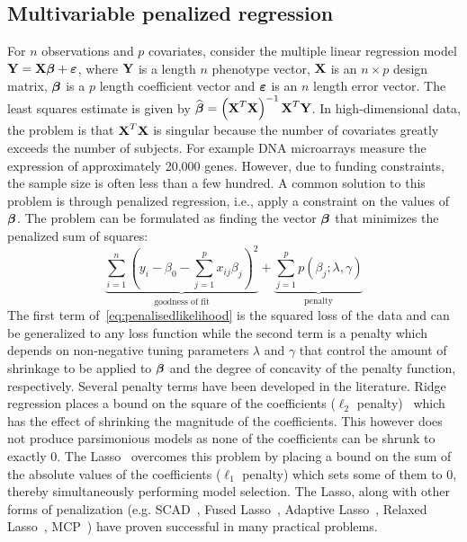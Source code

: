 \subsection{Multivariable penalized regression} \label{sec:pen}
For $n$ observations and $p$ covariates, consider the multiple linear regression model \mbox{$\textbf{Y} = \textbf{X} \boldsymbol{\beta} + \boldsymbol{\varepsilon}$}, where $\textbf{Y}$ is a length $n$ phenotype vector,  $\textbf{X}$ is an $n \times p$ design matrix, $\boldsymbol{\beta}$ is a $p$ length coefficient vector and $\boldsymbol{\varepsilon}$ is an $n$ length error vector. 
The least squares estimate is given by $ \widehat{\boldsymbol{\beta}} = \left( \textbf{X}^T \textbf{X}  \right)^{-1} \textbf{X}^T \textbf{Y} $. In high-dimensional data, the problem is that $\textbf{X}^T \textbf{X}$ is singular because the number of covariates greatly exceeds the number of subjects. 
For example DNA microarrays measure the expression of approximately 20,000 genes. 
However, due to funding constraints, the sample size is often less than a few hundred. 
A common solution to this problem is through penalized regression, i.e., apply a constraint on the values of $\boldsymbol{\beta}$. The problem can be formulated as finding the vector $\boldsymbol{\beta}$ that minimizes the penalized sum of squares:
\begin{equation}
\underbrace{\sum\limits_{i=1}^{n} \left( y_i - \beta_0 - \sum\limits_{j=1}^{p}x_{ij}\beta_j \right)^2}_{\textrm{goodness of fit}} +  \underbrace{\sum\limits_{j=1}^{p} p(\beta_j;\lambda, \gamma)}_{\textrm{penalty}} \label{eq:penalisedlikelihood}
\end{equation}
The first term of~\eqref{eq:penalisedlikelihood} is the squared loss of the data and can be generalized to any loss function while the second term is a penalty which depends on non-negative tuning parameters $\lambda$ and $\gamma$ that control the amount of shrinkage to be applied to $\boldsymbol{\beta}$ and the degree of concavity of the penalty function, respectively. 
Several penalty terms have been developed in the literature. Ridge regression places a bound on the square of the coefficients ($\ell_2$ penalty)~\citep{hoerl1970ridge} which has the effect of shrinking the magnitude of the coefficients. 
This however does not produce parsimonious models as none of the coefficients can be shrunk to exactly 0. The Lasso~\citep{tibshirani1996regression} overcomes this problem by placing a bound on the sum of the absolute values of the coefficients ($\ell_1$ penalty) which sets some of them to 0, thereby simultaneously performing model selection. The Lasso, along with other forms of penalization (e.g. SCAD~\cite{fan2001variable}, Fused Lasso~\citep{tibshirani2005sparsity}, Adaptive Lasso~\citep{zou2006adaptive}, Relaxed Lasso~\citep{meinshausen2007relaxed}, MCP~\citep{zhang2010nearly}) have proven successful in many practical problems.

